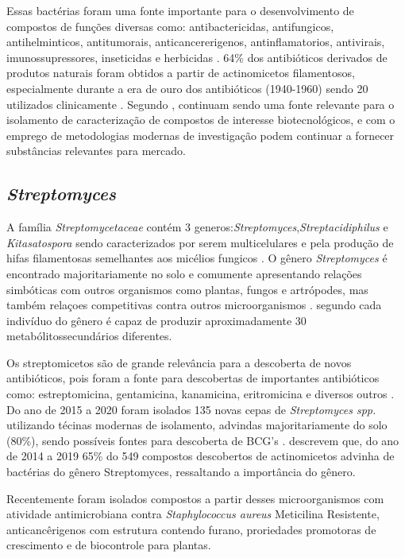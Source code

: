 Essas bactérias foram uma fonte importante para o desenvolvimento de compostos de funções
diversas como: antibactericidas, antifungicos, antihelminticos, antitumorais, anticancererigenos,
antinflamatorios, antivirais, imunossupressores, inseticidas e herbicidas \cite{demain2009,jose2021}. 
64\% dos antibióticos derivados de produtos naturais foram obtidos a partir de actinomicetos filamentosos,
especialmente durante a era de ouro dos antibióticos (1940-1960) sendo 20 utilizados clinicamente \cite{hutchings2019} .
Segundo , continuam sendo uma fonte relevante
para o isolamento de caracterização de compostos de interesse biotecnológicos, e com o
emprego de metodologias modernas de investigação podem continuar a fornecer
substâncias relevantes para mercado. 


\subsection{\textit{Streptomyces}}
A família \textit{Streptomycetaceae} contém 3 generos:\textit{Streptomyces},\textit{Streptacidiphilus} e \textit{Kitasatospora}
sendo caracterizados por serem multicelulares e pela produção de hifas filamentosas semelhantes aos micélios
fungicos \cite{claessen2014,flardh2009}. O gênero \textit{Streptomyces} é encontrado majoritariamente no solo e comumente apresentando 
relações simbóticas com outros organismos como plantas, fungos e artrópodes, mas também relaçoes competitivas contra 
outros microorganismos \cite{chater2016}. segundo  cada indivíduo do gênero é capaz de produzir aproximadamente 30
metabólitossecundários diferentes.

Os streptomicetos são de grande relevância para a descoberta de novos antibióticos,
pois foram a fonte para descobertas de importantes antibióticos 
como: estreptomicina, gentamicina, kanamicina, eritromicina e diversos outros \cite{demain2009}.
Do ano de 2015 a 2020 foram isolados 135 novas cepas de \textit{Streptomyces spp.} utilizando técinas 
modernas de isolamento, advindas majoritariamente
do solo (80\%), sendo possíveis fontes para descoberta de BCG's \cite{donald2022}. 
 descrevem que, do ano de 2014 a 2019 65\% do 549 compostos descobertos
de actinomicetos advinha de bactérias do gênero Streptomyces, ressaltando a importância do gênero.

Recentemente foram isolados compostos a partir desses microorganismos com atividade antimicrobiana contra
\textit{Staphylococcus aureus} Meticilina Resistente, anticancêrigenos com estrutura contendo furano, proriedades
promotoras de crescimento e de biocontrole para plantas. \cite{kemung2018,nguyen2020,suarez2019}

